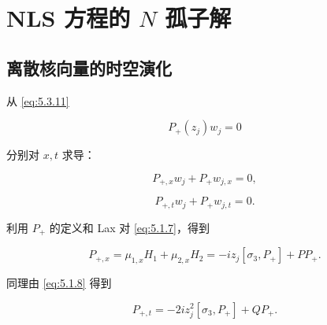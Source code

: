 \documentclass[
    lang=cn,
    scheme=chinese,
    mode=simple,
    device=normal,
    color=blue,
    math=cm,
    thmcnt=section,
    12pt
]{elegantbook}
\begin{document}


\section{NLS 方程的 \texorpdfstring{$N$}{N} 孤子解}

\subsection{离散核向量的时空演化}

从 \eqref{eq:5.3.11}

\[
    P_+(z_j)w_j=0
\]

分别对 $x,t$ 求导：

\begin{equation}
    P_{+,x}w_j+P_+w_{j,x}=0,
    \tag{5.4.1}
    \label{eq:5.4.1}
\end{equation}

\begin{equation}
    P_{+,t}w_j+P_+w_{j,t}=0.
    \tag{5.4.2}
    \label{eq:5.4.2}
\end{equation}

利用 $P_+$ 的定义和 Lax 对 \eqref{eq:5.1.7}，得到

\begin{equation}
    P_{+,x}
    =
    \mu_{1,x}H_1+\mu_{2,x}H_2
    =
    -iz_j[\sigma_3,P_+]+PP_+.
    \tag{5.4.3}
    \label{eq:5.4.3}
\end{equation}

同理由 \eqref{eq:5.1.8} 得到

\begin{equation}
    P_{+,t}
    =
    -2iz_j^2[\sigma_3,P_+]+QP_+.
    \tag{5.4.4}
    \label{eq:5.4.4}
\end{equation}
\end{document}
